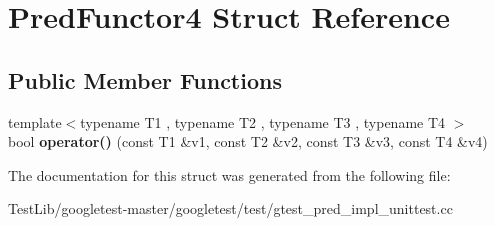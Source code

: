 \hypertarget{structPredFunctor4}{}\section{Pred\+Functor4 Struct Reference}
\label{structPredFunctor4}
\subsection*{Public Member Functions}
\begin{DoxyCompactItemize}
\item 
\mbox{\label{structPredFunctor4_a6cfb6ccd9a66bf93d9c43a49575e3869}} 
{\footnotesize template$<$typename T1 , typename T2 , typename T3 , typename T4 $>$ }\\bool {\bfseries operator()} (const T1 \&v1, const T2 \&v2, const T3 \&v3, const T4 \&v4)
\end{DoxyCompactItemize}


The documentation for this struct was generated from the following file\+:\begin{DoxyCompactItemize}
\item 
Test\+Lib/googletest-\/master/googletest/test/gtest\+\_\+pred\+\_\+impl\+\_\+unittest.\+cc\end{DoxyCompactItemize}
